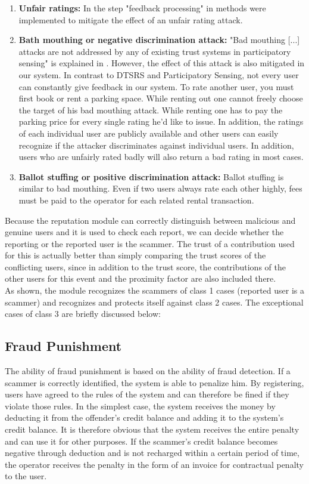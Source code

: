\documentclass[
a4paper,     %
titlepage,   %
14pt         %
]{scrartcl}  %
\theoremstyle{mystyle}
\begin{document}
\begin{enumerate}
\item \textbf{Unfair ratings:} In the step "feedback processing" in \cite{mousa2017reputation} methods were implemented to mitigate the effect of an unfair rating attack.
\item \textbf{Bath mouthing or negative discrimination attack:} "Bad mouthing [...] attacks are not addressed by any of existing trust systems in participatory sensing" is explained in \cite{mousa2015trust}. However, the effect of this attack is also mitigated in our system. In contrast to DTSRS and Participatory Sensing, not every user can constantly give feedback in our system. To rate another user, you must first book or rent a parking space. While renting out one cannot freely choose the target of his bad mouthing attack. While renting one has to pay the parking price for every single rating he'd like to issue. In addition, the ratings of each individual user are publicly available and other users can easily recognize if the attacker discriminates against individual users. In addition, users who are unfairly rated badly will also return a bad rating in most cases.
\item \textbf{Ballot stuffing or positive discrimination attack:} Ballot stuffing is similar to bad mouthing. Even if two users always rate each other highly, fees must be paid to the operator for each related rental transaction.
\end{enumerate}

Because the reputation module can correctly distinguish between malicious and genuine users and it is used to check each report, we can decide whether the reporting or the reported user is the scammer. The trust of a contribution used for this is actually better than simply comparing the trust scores of the conflicting users, since in addition to the trust score, the contributions of the other users for this event and the proximity factor are also included there. \\

As shown, the module recognizes the scammers of class 1 cases (reported user is a scammer) and recognizes and protects itself against class 2 cases. The exceptional cases of class 3 are briefly discussed below: 


\subsection{Fraud Punishment}
The ability of fraud punishment is based on the ability of fraud detection. If a scammer is correctly identified, the system is able to penalize him. By registering, users have agreed to the rules of the system and can therefore be fined if they violate those rules. In the simplest case, the system receives the money by deducting it from the offender's credit balance and adding it to the system's credit balance. It is therefore obvious that the system receives the entire penalty and can use it for other purposes. If the scammer's credit balance becomes negative through deduction and is not recharged within a certain period of time, the operator receives the penalty in the form of an invoice for contractual penalty to the user.
\end{document}
